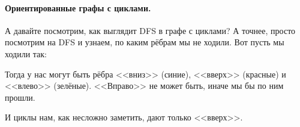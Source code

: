 \documentclass{article}
\begin{document}
    \paragraph{Ориентированные графы с циклами.}
    А давайте посмотрим, как выглядит DFS в графе с циклами? А точнее, просто посмотрим на DFS и узнаем, по каким рёбрам мы не ходили. Вот пусть мы ходили так:
    \begin{figure}[H]
    \end{figure}\noindent
    Тогда у нас могут быть рёбра <<вниз>> (синие), <<вверх>> (красные) и <<влево>> (зелёные). <<Вправо>> не может быть, иначе мы бы по ним прошли.
    \begin{figure}[H]
    \end{figure}\noindent
    И циклы нам, как несложно заметить, дают только <<вверх>>.
\end{document}
